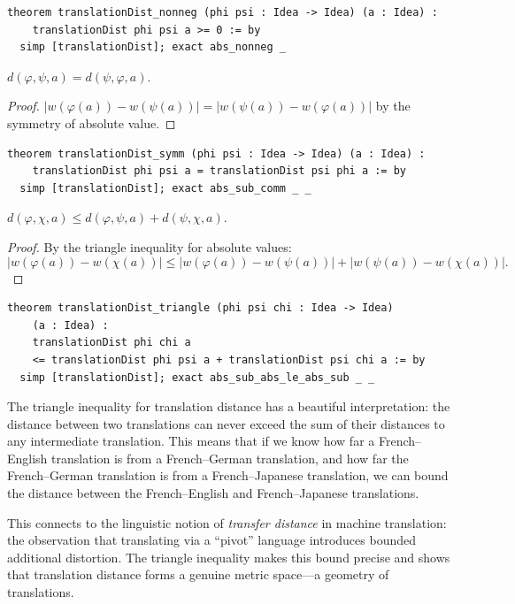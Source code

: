 \begin{lstlisting}
theorem translationDist_nonneg (phi psi : Idea -> Idea) (a : Idea) :
    translationDist phi psi a >= 0 := by
  simp [translationDist]; exact abs_nonneg _
\end{lstlisting}

\begin{theorem}
\label{thm:dist-symm}
$d(\varphi, \psi, a) = d(\psi, \varphi, a)$.
\end{theorem}

\begin{proof}
$|w(\varphi(a)) - w(\psi(a))| = |w(\psi(a)) - w(\varphi(a))|$ by the
symmetry of absolute value.
\end{proof}

\begin{lstlisting}
theorem translationDist_symm (phi psi : Idea -> Idea) (a : Idea) :
    translationDist phi psi a = translationDist psi phi a := by
  simp [translationDist]; exact abs_sub_comm _ _
\end{lstlisting}

\begin{theorem}
\label{thm:dist-triangle}
$d(\varphi, \chi, a) \leq d(\varphi, \psi, a) + d(\psi, \chi, a)$.
\end{theorem}

\begin{proof}
By the triangle inequality for absolute values:
\[
  |w(\varphi(a)) - w(\chi(a))|
    \leq |w(\varphi(a)) - w(\psi(a))| + |w(\psi(a)) - w(\chi(a))|.
\]
\end{proof}

\begin{lstlisting}
theorem translationDist_triangle (phi psi chi : Idea -> Idea)
    (a : Idea) :
    translationDist phi chi a
    <= translationDist phi psi a + translationDist psi chi a := by
  simp [translationDist]; exact abs_sub_abs_le_abs_sub _ _
\end{lstlisting}

\begin{interpretation}
\label{int:dist-metric}
The triangle inequality for translation distance has a beautiful
interpretation: the distance between two translations can never exceed the
sum of their distances to any intermediate translation.  This means that if
we know how far a French--English translation is from a French--German
translation, and how far the French--German translation is from a
French--Japanese translation, we can bound the distance between the
French--English and French--Japanese translations.

This connects to the linguistic notion of \emph{transfer distance} in
machine translation: the observation that translating via a ``pivot''
language introduces bounded additional distortion.  The triangle inequality
makes this bound precise and shows that translation distance forms a
genuine metric space---a geometry of translations.
\end{interpretation}

